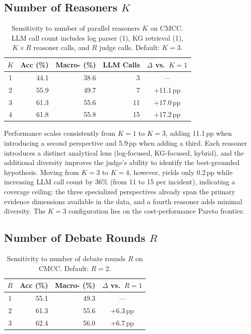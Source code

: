 \subsection{Number of Reasoners \texorpdfstring{$K$}{K}}

\begin{table}[H]
\centering
\caption{Sensitivity to number of parallel reasoners $K$ on CMCC. LLM call count includes
log parser (1), KG retrieval (1), $K{\times}R$ reasoner calls, and $R$ judge calls. Default:
$K{=}3$.}
\label{tab:sensitivity-k}
\begin{tabular}{crrrc}
\toprule
$K$ & \textbf{Acc (\%)} & \textbf{Macro-\fone{} (\%)} & \textbf{LLM Calls} & \textbf{$\Delta$\fone{} vs.\ $K{=}1$} \\
\midrule
1 & 44.1 & 38.6 &  3 & ---         \\
2 & 55.9 & 49.7 &  7 & $+$11.1\,pp \\
3 & 61.3 & 55.6 & 11 & $+$17.0\,pp \\
4 & 61.8 & 55.8 & 15 & $+$17.2\,pp \\
\bottomrule
\end{tabular}
\end{table}

Performance scales consistently from $K{=}1$ to $K{=}3$, adding 11.1\,pp when introducing a
second perspective and 5.9\,pp when adding a third. Each reasoner introduces a distinct
analytical lens (log-focused, KG-focused, hybrid), and the additional diversity improves the
judge's ability to identify the best-grounded hypothesis. Moving from $K{=}3$ to $K{=}4$,
however, yields only 0.2\,pp while increasing LLM call count by 36\% (from 11 to 15 per
incident), indicating a coverage ceiling: the three specialized perspectives already span the
primary evidence dimensions available in the data, and a fourth reasoner adds minimal diversity.
The $K{=}3$ configuration lies on the cost-performance Pareto frontier.

\subsection{Number of Debate Rounds \texorpdfstring{$R$}{R}}

\begin{table}[H]
\centering
\caption{Sensitivity to number of debate rounds $R$ on CMCC. Default: $R{=}2$.}
\label{tab:sensitivity-rounds}
\begin{tabular}{crrc}
\toprule
$R$ & \textbf{Acc (\%)} & \textbf{Macro-\fone{} (\%)} & \textbf{$\Delta$\fone{} vs.\ $R{=}1$} \\
\midrule
1 & 55.1 & 49.3 & ---        \\
2 & 61.3 & 55.6 & $+$6.3\,pp \\
3 & 62.4 & 56.0 & $+$6.7\,pp \\
\bottomrule
\end{tabular}
\end{table}

